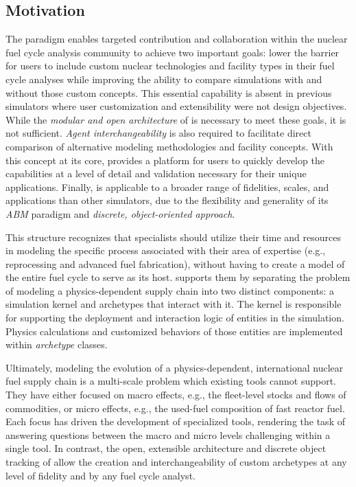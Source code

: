 \subsection{Motivation}

The \Cyclus paradigm enables targeted contribution and collaboration within the
nuclear fuel cycle analysis community to achieve two important goals: lower the
barrier for users to include custom nuclear technologies and facility types in 
their fuel cycle
analyses while improving the ability to compare simulations with and without
those custom concepts.  This essential capability is absent in
previous simulators where user customization and extensibility were not design
objectives.  While the \emph{modular and open architecture} of
\Cyclus is necessary to meet these goals, it is not sufficient.
\emph{Agent interchangeability} is also required to facilitate direct comparison
of alternative modeling methodologies and facility concepts. With this concept
at its core, \Cyclus provides a platform for users to quickly develop the
capabilities at a level of detail and validation necessary for their
unique applications.  Finally, \Cyclus is applicable to a broader range of
fidelities, scales, and applications than other simulators, due to the
flexibility and generality of its \emph{\gls{ABM}} paradigm and \emph{discrete,
object-oriented approach}.

This structure recognizes that specialists should utilize their time and
resources in modeling the specific process associated with their area of
expertise (e.g., reprocessing and advanced fuel fabrication), without having to
create a model of the entire fuel cycle to serve as its host.  \Cyclus supports
them by separating the problem of modeling a physics-dependent supply chain into
two distinct components: a simulation kernel and archetypes that interact with
it. The kernel is responsible for supporting the deployment and
interaction logic of entities in the simulation.  Physics calculations and
customized behaviors of those entities are implemented within \emph{archetype}
classes.

Ultimately, modeling the evolution of a physics-dependent, international
nuclear fuel supply chain is a multi-scale problem which existing tools cannot
support. They have either focused on macro effects, e.g., the fleet-level
stocks and flows of commodities, or micro effects, e.g., the used-fuel
composition of fast reactor fuel. Each focus has driven the development of
specialized tools, rendering the task of answering questions between the macro
and micro levels challenging within a single tool.  In contrast, the open, extensible
architecture and discrete object tracking of \Cyclus allow the creation and
interchangeability of custom archetypes at any level of fidelity and by any
fuel cycle analyst.



